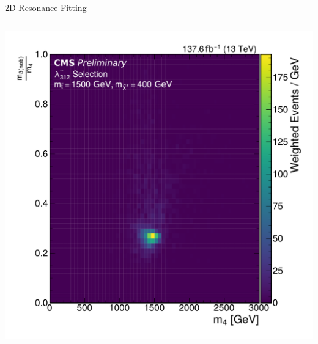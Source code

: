 \documentclass[]{beamer}
\begin{document}
\begin{frame}{2D Resonance Fitting}
\begin{columns}[t]
\begin{column}{0.3\textwidth}
\begin{onlyenv}
\begin{center}
          \includegraphics[width=\thiswidth\textwidth]{figures/ratio_m14_vs_m3_top_3_no_lead_b_signal_312_1500_400.pdf}
        \end{center}
      \end{onlyenv}
    \end{column}
  \end{columns}
\end{frame}
\end{document}
